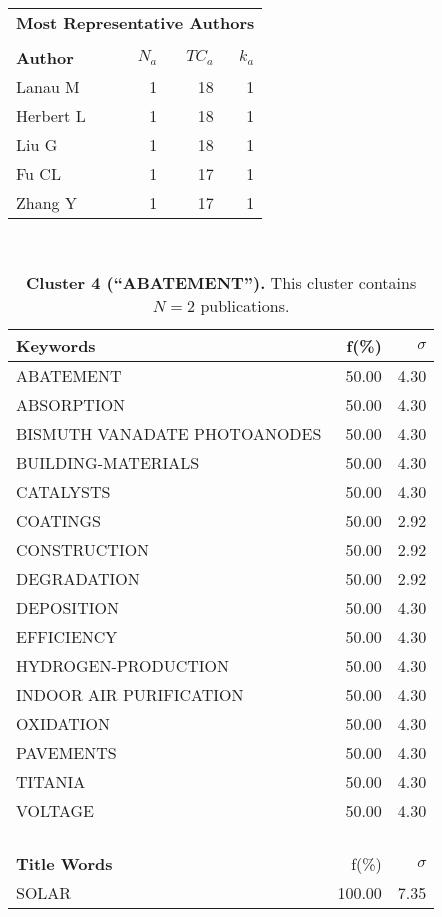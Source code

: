 \documentclass[a4paper,11pt]{report}
\begin{document}
\begin{landscape}
\begin{table}[!ht]
{\begin{tabular}{|l r r r|}
\hline
\hline
\multicolumn{4}{|c|}{{\bf Most Representative Authors}}\\
&&&\\
{\bf Author} & {\bf $N_a$} & {\bf $TC_a$} & {\bf $k_a$}\\
Lanau M & 1 & 18 & 1 \\
Herbert L & 1 & 18 & 1 \\
Liu G & 1 & 18 & 1 \\
Fu CL & 1 & 17 & 1 \\
Zhang Y & 1 & 17 & 1 \\
\hline
\end{tabular}
}
\end{table}

\clearpage

\begin{table}[!ht]
\caption*{{\bf Cluster 4 (``ABATEMENT'').} This cluster contains $N = 2$ publications.} 
\textcolor{white}{aa}\\
{\scriptsize\begin{tabular}{|p{5cm} r r|}
\hline
{\bf Keywords }& f(\%) & $\sigma$\\
\hline
ABATEMENT & 50.00 & 4.30\\
ABSORPTION & 50.00 & 4.30\\
BISMUTH VANADATE PHOTOANODES & 50.00 & 4.30\\
BUILDING-MATERIALS & 50.00 & 4.30\\
CATALYSTS & 50.00 & 4.30\\
COATINGS & 50.00 & 2.92\\
CONSTRUCTION & 50.00 & 2.92\\
DEGRADATION & 50.00 & 2.92\\
DEPOSITION & 50.00 & 4.30\\
EFFICIENCY & 50.00 & 4.30\\
HYDROGEN-PRODUCTION & 50.00 & 4.30\\
INDOOR AIR PURIFICATION & 50.00 & 4.30\\
OXIDATION & 50.00 & 4.30\\
PAVEMENTS & 50.00 & 4.30\\
TITANIA & 50.00 & 4.30\\
VOLTAGE & 50.00 & 4.30\\
 &  & \\
 &  & \\
 &  & \\
 &  & \\
\hline
{\bf Title Words }& f(\%) & $\sigma$\\
\hline
SOLAR & 100.00 & 7.35\\

\end{tabular}}
\end{table}
\end{landscape}
\end{document}
